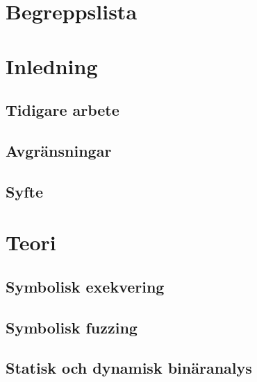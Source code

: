 \documentclass[12pt, a4paper]{report}
\begin{document}


\newpage


\newpage
{} %
\setcounter{page}{3}

\tableofcontents
\newpage

\chapter*{Begreppslista}


\newpage


\chapter{Inledning}

\section{Tidigare arbete}

\section{Avgränsningar}

\section{Syfte}


\chapter{Teori}

\section{Symbolisk exekvering}

\section{Symbolisk fuzzing}

\section{Statisk och dynamisk binäranalys}

\end{document}

